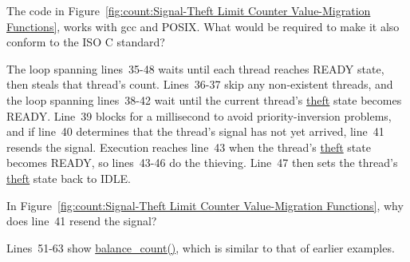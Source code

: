 \QuickQuiz{}
	The code in
	Figure~\ref{fig:count:Signal-Theft Limit Counter Value-Migration Functions},
	works with gcc and POSIX.
	What would be required to make it also conform to the ISO C standard?
 \QuickQuizEnd

The loop spanning lines~35-48 waits until each thread reaches READY state,
then steals that thread's count.
Lines~36-37 skip any non-existent threads, and the loop spanning
lines~38-42 wait until the current thread's \url{theft} state becomes READY.
Line~39 blocks for a millisecond to avoid priority-inversion problems,
and if line~40 determines that the thread's signal has not yet arrived,
line~41 resends the signal.
Execution reaches line~43 when the thread's \url{theft} state becomes
READY, so lines~43-46 do the thieving.
Line~47 then sets the thread's \url{theft} state back to IDLE.

\QuickQuiz{}
	In Figure~\ref{fig:count:Signal-Theft Limit Counter Value-Migration Functions}, why does line~41 resend the signal?
 \QuickQuizEnd

Lines~51-63 show \url{balance_count()}, which is similar to that of
earlier examples.

